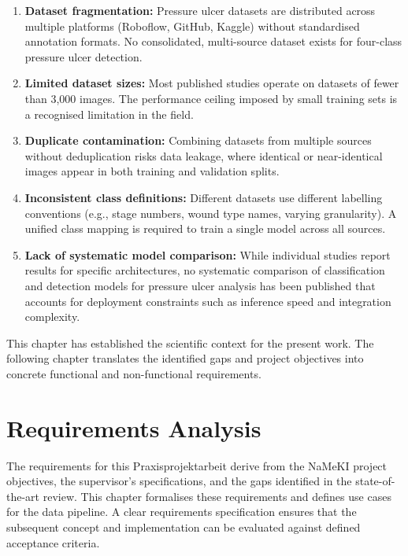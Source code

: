 \documentclass[a4paper,12pt,twoside]{report}
\begin{document}
\begin{enumerate}
  \item \textbf{Dataset fragmentation:} Pressure ulcer datasets are distributed
    across multiple platforms (Roboflow, GitHub, Kaggle) without standardised
    annotation formats. No consolidated, multi-source dataset exists for
    four-class pressure ulcer detection.

  \item \textbf{Limited dataset sizes:} Most published studies operate on
    datasets of fewer than 3,000 images. The performance ceiling imposed by
    small training sets is a recognised limitation in the field.

  \item \textbf{Duplicate contamination:} Combining datasets from multiple
    sources without deduplication risks data leakage, where identical or
    near-identical images appear in both training and validation splits.

  \item \textbf{Inconsistent class definitions:} Different datasets use
    different labelling conventions (e.g., stage numbers, wound type names,
    varying granularity). A unified class mapping is required to train a single
    model across all sources.

  \item \textbf{Lack of systematic model comparison:} While individual studies
    report results for specific architectures, no systematic comparison of
    classification and detection models for pressure ulcer analysis has been
    published that accounts for deployment constraints such as inference speed
    and integration complexity.
\end{enumerate}

This chapter has established the scientific context for the present work. The
following chapter translates the identified gaps and project objectives into
concrete functional and non-functional requirements.

\chapter{Requirements Analysis}
\label{ch:requirements}

The requirements for this Praxisprojektarbeit derive from the NaMeKI project
objectives, the supervisor's specifications, and the gaps identified in the
state-of-the-art review. This chapter formalises these requirements and defines
use cases for the data pipeline. A clear requirements specification ensures that
the subsequent concept and implementation can be evaluated against defined
acceptance criteria.
\end{document}

